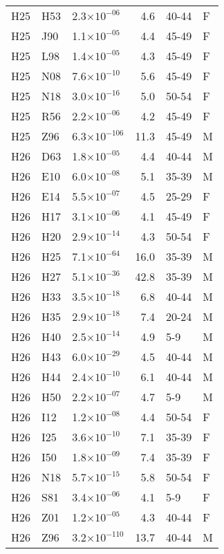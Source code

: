 \begin{longtable}{lllrll}
   H25 & H53 & 2.3$\times10^{-06}$ & 4.6 & 40-44 & F \\ 
   H25 & J90 & 1.1$\times10^{-05}$ & 4.4 & 45-49 & F \\ 
   H25 & L98 & 1.4$\times10^{-05}$ & 4.3 & 45-49 & F \\ 
   H25 & N08 & 7.6$\times10^{-10}$ & 5.6 & 45-49 & F \\ 
   H25 & N18 & 3.0$\times10^{-16}$ & 5.0 & 50-54 & F \\ 
   H25 & R56 & 2.2$\times10^{-06}$ & 4.2 & 45-49 & F \\ 
   H25 & Z96 & 6.3$\times10^{-106}$ & 11.3 & 45-49 & M \\ 
   H26 & D63 & 1.8$\times10^{-05}$ & 4.4 & 40-44 & M \\ 
   H26 & E10 & 6.0$\times10^{-08}$ & 5.1 & 35-39 & M \\ 
   H26 & E14 & 5.5$\times10^{-07}$ & 4.5 & 25-29 & F \\ 
   H26 & H17 & 3.1$\times10^{-06}$ & 4.1 & 45-49 & F \\ 
   H26 & H20 & 2.9$\times10^{-14}$ & 4.3 & 50-54 & F \\ 
   H26 & H25 & 7.1$\times10^{-64}$ & 16.0 & 35-39 & M \\ 
   H26 & H27 & 5.1$\times10^{-36}$ & 42.8 & 35-39 & M \\ 
   H26 & H33 & 3.5$\times10^{-18}$ & 6.8 & 40-44 & M \\ 
   H26 & H35 & 2.9$\times10^{-18}$ & 7.4 & 20-24 & M \\ 
   H26 & H40 & 2.5$\times10^{-14}$ & 4.9 & 5-9 & M \\ 
   H26 & H43 & 6.0$\times10^{-29}$ & 4.5 & 40-44 & M \\ 
   H26 & H44 & 2.4$\times10^{-10}$ & 6.1 & 40-44 & M \\ 
   H26 & H50 & 2.2$\times10^{-07}$ & 4.7 & 5-9 & M \\ 
   H26 & I12 & 1.2$\times10^{-08}$ & 4.4 & 50-54 & F \\ 
   H26 & I25 & 3.6$\times10^{-10}$ & 7.1 & 35-39 & F \\ 
   H26 & I50 & 1.8$\times10^{-09}$ & 7.4 & 35-39 & F \\ 
   H26 & N18 & 5.7$\times10^{-15}$ & 5.8 & 50-54 & F \\ 
   H26 & S81 & 3.4$\times10^{-06}$ & 4.1 & 5-9 & F \\ 
   H26 & Z01 & 1.2$\times10^{-05}$ & 4.3 & 40-44 & F \\ 
   H26 & Z96 & 3.2$\times10^{-110}$ & 13.7 & 40-44 & M \\ 

\end{longtable}

